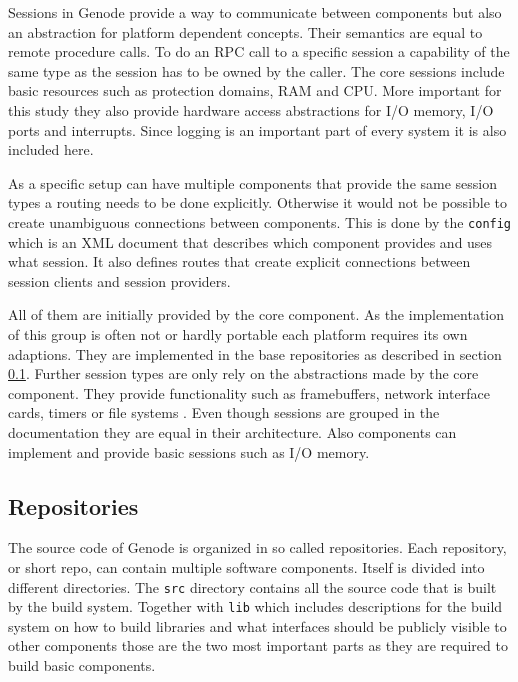 \documentclass[
a4paper,
11pt,
twoside
]{report}
\begin{document}
		Sessions in Genode provide a way to communicate between components but also an abstraction for platform dependent concepts.
		Their semantics are equal to remote procedure calls.
		To do an RPC call to a specific session a capability of the same type as the session has to be owned by the caller.
		The core sessions include basic resources such as protection domains, RAM and CPU.
		More important for this study they also provide hardware access abstractions for I/O memory, I/O ports and interrupts.
		Since logging is an important part of every system it is also included here.
		
		As a specific setup can have multiple components that provide the same session types a routing needs to be done explicitly.
		Otherwise it would not be possible to create unambiguous connections between components.
		This is done by the \texttt{config} which is an XML document that describes which component provides and uses what session.
		It also defines routes that create explicit connections between session clients and session providers.
		
		All of them are initially provided by the core component.
		As the implementation of this group is often not or hardly portable each platform requires its own adaptions.
		They are implemented in the base repositories as described in section \ref{repos}.
		Further session types are only rely on the abstractions made by the core component.
		They provide functionality such as framebuffers, network interface cards, timers or file systems \citep{genode}.
		Even though sessions are grouped in the documentation they are equal in their architecture.
		Also components can implement and provide basic sessions such as I/O memory.
		
		\subsection{Repositories}
		\label{repos}
		
		The source code of Genode is organized in so called repositories.
		Each repository, or short repo, can contain multiple software components.
		Itself is divided into different directories.
		The \texttt{src} directory contains all the source code that is built by the build system.
		Together with \texttt{lib} which includes descriptions for the build system on how to build libraries and what interfaces should be publicly visible to other components those are the two most important parts as they are required to build basic components.
		
\end{document}
